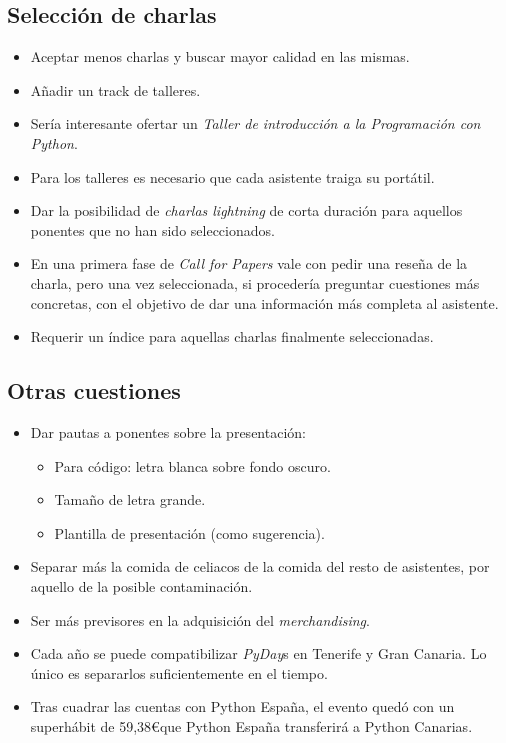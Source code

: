 \documentclass[a4paper, 12pt]{article}
\begin{document}
\subsection*{Selección de charlas}

\begin{itemize}
    \item Aceptar menos charlas y buscar mayor calidad en las mismas.
    \item Añadir un track de talleres.
    \item Sería interesante ofertar un \textit{Taller de introducción a la Programación con Python}.
    \item Para los talleres es necesario que cada asistente traiga su portátil.
    \item Dar la posibilidad de \textit{charlas lightning} de corta duración para aquellos ponentes que no han sido seleccionados.
    \item En una primera fase de \textit{Call for Papers} vale con pedir una reseña de la charla, pero una vez seleccionada, si procedería preguntar cuestiones más concretas, con el objetivo de dar una información más completa al asistente.
    \item Requerir un índice para aquellas charlas finalmente seleccionadas.
\end{itemize}

\subsection*{Otras cuestiones}

\begin{itemize}
    \item Dar pautas a ponentes sobre la presentación:
    \begin{itemize}
        \item Para código: letra blanca sobre fondo oscuro.
        \item Tamaño de letra grande.
        \item Plantilla de presentación (como sugerencia).
    \end{itemize}
    \item Separar más la comida de celiacos de la comida del resto de asistentes, por aquello de la posible contaminación.
    \item Ser más previsores en la adquisición del \textit{merchandising}.
    \item Cada año se puede compatibilizar \textit{PyDay}s en Tenerife y Gran Canaria. Lo único es separarlos suficientemente en el tiempo.
    \item Tras cuadrar las cuentas con Python España, el evento quedó con un superhábit de 59,38\euro que Python España transferirá a Python Canarias.
\end{itemize}
\end{document}
